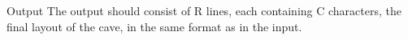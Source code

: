 Output
The output should consist of R lines, each containing C characters, the final layout of the cave, in the same format as in the input.